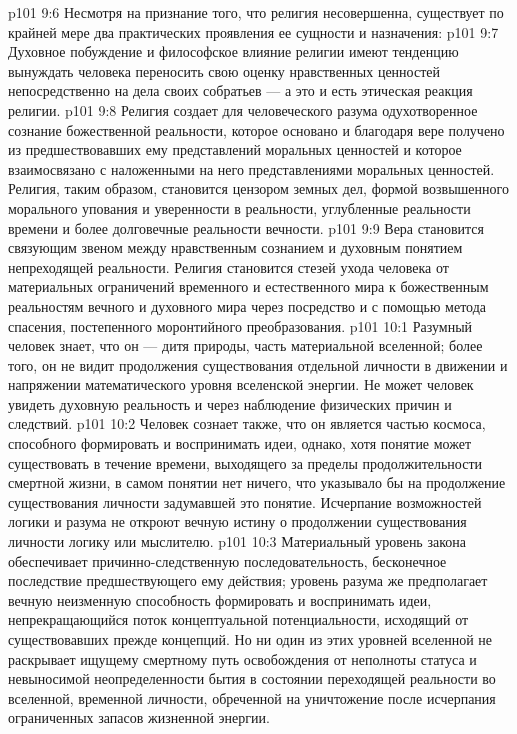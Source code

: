 \vs p101 9:6 \pc Несмотря на признание того, что религия несовершенна, существует по крайней мере два практических проявления ее сущности и назначения:
\vs p101 9:7 \bibnobreakspace Духовное побуждение и философское влияние религии имеют тенденцию вынуждать человека переносить свою оценку нравственных ценностей непосредственно на дела своих собратьев --- а это и есть этическая реакция религии.
\vs p101 9:8 \pc {}\bibnobreakspace Религия создает для человеческого разума одухотворенное сознание божественной реальности, которое основано и благодаря вере получено из предшествовавших ему представлений моральных ценностей и которое взаимосвязано с наложенными на него представлениями моральных ценностей. Религия, таким образом, становится цензором земных дел, формой возвышенного морального упования и уверенности в реальности, углубленные реальности времени и более долговечные реальности вечности.
\vs p101 9:9 \pc Вера становится связующим звеном между нравственным сознанием и духовным понятием непреходящей реальности. Религия становится стезей ухода человека от материальных ограничений временного и естественного мира к божественным реальностям вечного и духовного мира через посредство и с помощью метода спасения, постепенного моронтийного преобразования.
\vs p101 10:1 Разумный человек знает, что он --- дитя природы, часть материальной вселенной; более того, он не видит продолжения существования отдельной личности в движении и напряжении математического уровня вселенской энергии. Не может человек увидеть духовную реальность и через наблюдение физических причин и следствий.
\vs p101 10:2 Человек сознает также, что он является частью космоса, способного формировать и воспринимать идеи, однако, хотя понятие может существовать в течение времени, выходящего за пределы продолжительности смертной жизни, в самом понятии нет ничего, что указывало бы на продолжение существования личности задумавшей это понятие. Исчерпание возможностей логики и разума не откроют вечную истину о продолжении существования личности логику или мыслителю.
\vs p101 10:3 Материальный уровень закона обеспечивает причинно\hyp{}следственную последовательность, бесконечное последствие предшествующего ему действия; уровень разума же предполагает вечную неизменную способность формировать и воспринимать идеи, непрекращающийся поток концептуальной потенциальности, исходящий от существовавших прежде концепций. Но ни один из этих уровней вселенной не раскрывает ищущему смертному путь освобождения от неполноты статуса и невыносимой неопределенности бытия в состоянии переходящей реальности во вселенной, временной личности, обреченной на уничтожение после исчерпания ограниченных запасов жизненной энергии.
